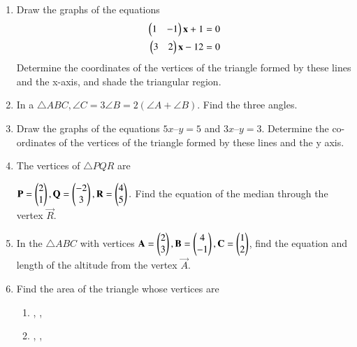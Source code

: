 \renewcommand{\theequation}{\theenumi}
\begin{enumerate}[label=\arabic*.,ref=\thesubsection.\theenumi]
%
\item Draw the graphs of the equations 
\begin{align}
\label{eq:1.2.1_p1}
\begin{pmatrix}1 & -1\end{pmatrix}\mathbf{x} + 1 &= 0 
\\
\begin{pmatrix} 3 & 2\end{pmatrix}\mathbf{x} - 12 &= 0
\label{eq:1.2.1_p2}
\end{align}
%
 Determine the coordinates of the vertices of the triangle formed by these lines and the x-axis, and shade the triangular region.
\\
\solution

%
\item In a $\triangle ABC, \angle C = 3 \angle B = 2 (\angle A + \angle B)$. Find the three angles. 
\\
\solution

\item Draw the graphs of the equations $5x – y = 5$ and $3x – y = 3$. Determine the co-ordinates of the vertices of the triangle formed by these lines and the y axis.
\\
\solution


\item The vertices of $\triangle PQR$ are 

$
\mathbf{P} = \begin{pmatrix}2 \\1\end{pmatrix},
\mathbf{Q} = \begin{pmatrix}-2\\3\end{pmatrix},
\mathbf{R} = \begin{pmatrix}4\\5\end{pmatrix}.
$
Find the equation of the median through the vertex $\vec{R}$.
\\
\solution

\item In the $\triangle ABC$ with vertices
$
\mathbf{A}=\begin{pmatrix}2\\3\end{pmatrix}, 
\mathbf{B}=\begin{pmatrix}4\\-1\end{pmatrix},
 \mathbf{C}=\begin{pmatrix}1\\2\end{pmatrix}
$,
find the equation and length of the altitude from the vertex $\vec{A}$.
\item Find the area of the triangle whose vertices are
\begin{enumerate}
\item {}, ,  
\item  {},  ,  
\end{enumerate}
\solution



\end{enumerate}
